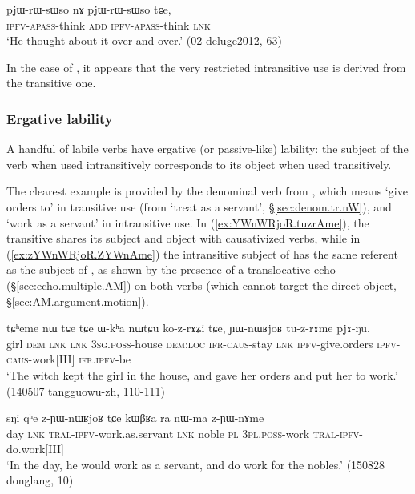 \begin{exe}
\ex \label{ex:pjWrWsWso}
\gll  pjɯ-rɯ-sɯso nɤ pjɯ-rɯ-sɯso tɕe, \\
\textsc{ipfv}-\textsc{apass}-think \textsc{add} \textsc{ipfv}-\textsc{apass}-think \textsc{lnk} \\
\glt `He thought about it over and over.' (02-deluge2012, 63)
\end{exe}

In the case of ,  it appears that the very restricted intransitive use is derived from the transitive one. 

\subsubsection{Ergative lability} \label{sec:lability.pass}
A handful of labile verbs have ergative (or passive-like) lability: the subject of the verb when used intransitively corresponds to its object when used transitively. 

The clearest example is provided by the denominal verb  from , which  means `give orders to' in transitive use (from `treat as a servant', §\ref{sec:denom.tr.nW}), and `work as a servant' in intransitive use. In (\ref{ex:YWnWRjoR.tuzrAme}), the transitive   shares its subject and object with causativized verbs, while in (\ref{ex:zYWnWRjoR.ZYWnAme}) the intransitive subject of  has the same referent as the subject of , as shown by the presence of a translocative echo (§\ref{sec:echo.multiple.AM}) on both verbs (which cannot target the direct object, §\ref{sec:AM.argument.motion}). 

\begin{exe}
\ex \label{ex:YWnWRjoR.tuzrAme}
\gll tɕʰeme nɯ tɕe tɕe ɯ-kʰa nɯtɕu ko-z-rɤʑi tɕe, ɲɯ-nɯʁjoʁ tu-z-rɤme pjɤ-ŋu. \\
girl \textsc{dem} \textsc{lnk} \textsc{lnk} \textsc{3sg}.\textsc{poss}-house \textsc{dem}:\textsc{loc} \textsc{ifr}-\textsc{caus}-stay \textsc{lnk} \textsc{ipfv}-give.orders \textsc{ipfv}-\textsc{caus}-work[III] \textsc{ifr}.\textsc{ipfv}-be \\
\glt `The witch kept the girl in the house, and gave her orders and put her to work.' (140507 tangguowu-zh, 110-111)
\end{exe}


\begin{exe}
\ex \label{ex:zYWnWRjoR.ZYWnAme}
\gll sŋi qʰe z-ɲɯ-nɯʁjoʁ tɕe kɯβʁa ra nɯ-ma z-ɲɯ-nɤme \\
day \textsc{lnk} \textsc{tral}-\textsc{ipfv}-work.as.servant \textsc{lnk} noble \textsc{pl} \textsc{3pl}.\textsc{poss}-work \textsc{tral}-\textsc{ipfv}-do.work[III] \\
\glt `In the day, he would work as a servant, and do work for the nobles.' (150828 donglang, 10)
\end{exe}


